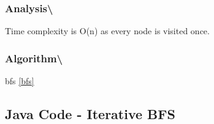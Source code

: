 \documentclass[]{book}
\begin{document}
\hypertarget{analysis-83}{%
\subsubsection{Analysis\textbackslash{}}\label{analysis-83}}

Time complexity is O(n) as every node is visited once.

\hypertarget{algorithm-84}{%
\subsubsection{Algorithm\textbackslash{}}\label{algorithm-84}}

bfs \ref{bfs}

\hypertarget{java-code---iterative-bfs}{%
\subsection{Java Code - Iterative BFS}\label{java-code---iterative-bfs}}
\end{document}

